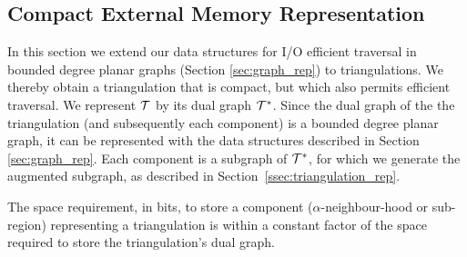 \subsection{Compact External Memory Representation}
\label{ssec:compact_tin_external}

In this section we extend our data structures for I/O efficient traversal in 
bounded degree planar graphs (Section \ref{sec:graph_rep}) to triangulations. 
We thereby obtain a triangulation that is compact, but which also 
permits efficient traversal. 
We represent $\mathcal{T}$ by its dual graph $\mathcal{T}^*$. 
Since the dual graph of the the triangulation (and subsequently each component) is a 
bounded degree planar graph, it can be represented with the data structures 
described in Section \ref{sec:graph_rep}. 
Each component is a subgraph of $\mathcal{T}^*$, for which we generate the 
augmented subgraph, as described in Section~\ref{ssec:triangulation_rep}.

\begin{lemma}\label{lem:terrain_components}
The space requirement, in bits, to store a component ($\alpha$-neighbour-hood
 or sub-region) representing a triangulation is within a constant factor of the 
space required to store the triangulation's dual graph. 
\end{lemma}

